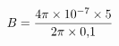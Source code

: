 \documentclass[preview]{standalone}
\begin{document}
\begin{align*}
\special{dvisvgm:raw <g id='unique000'>}B=\frac{4\pi\times10^{-7}\times5}{2\pi\times0{,}1}\special{dvisvgm:raw </g>}
\end{align*}
\end{document}
